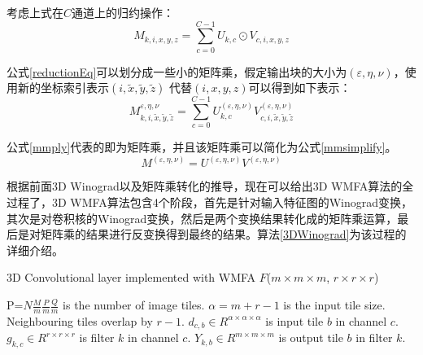 考虑上式在$C$通道上的归约操作：
\begin{equation}
\label{reductionEq}
M_{k,i,x,y,z} = \sum_{c=0}^{C-1}U_{k,c}\odot V_{c,i,x,y,z}
\end{equation} 

公式\ref{reductionEq}可以划分成一些小的矩阵乘，假定输出块的大小为$(\varepsilon,\eta,\nu)$，使用新的坐标索引表示$(i,\tilde{x},\tilde{y},\tilde{z})$ 代替$(i,x,y,z)$可以得到如下表示：
\begin{equation}
\label{mmply}
M_{k,i,\tilde{x},\tilde{y},\tilde{z}}^{\varepsilon,\eta,\nu} = \sum_{c=0}^{C-1}U_{k,c}^{(\varepsilon,\eta,\nu)}V_{c,i,\tilde{x},\tilde{y},\tilde{z}}^{(\varepsilon,\eta,\nu)}
\end{equation} 

公式\ref{mmply}代表的即为矩阵乘，并且该矩阵乘可以简化为公式\ref{mmsimplify}。
\begin{equation}
\label{mmsimplify}
M^{(\varepsilon,\eta,\nu)} = U^{(\varepsilon,\eta,\nu)}V^{(\varepsilon,\eta,\nu)}
\end{equation}

根据前面3D Winograd以及矩阵乘转化的推导，现在可以给出3D WMFA算法的全过程了，3D WMFA算法包含4个阶段，首先是针对输入特征图的Winograd变换，其次是对卷积核的Winograd变换，然后是两个变换结果转化成的矩阵乘运算，最后是对矩阵乘的结果进行反变换得到最终的结果。算法\ref{3DWinograd}为该过程的详细介绍。
\begin{algorithm}
\caption{3D Convolutional layer implemented with WMFA $F$($m \times m \times m$, $r \times r \times r$)}
 \label{3DWinograd}
\begin{algorithmic} 
\STATE P=$N{\frac{M}{m}}{\frac{P}{m}}{\frac{Q}{m}}$ is the number of image tiles.
\STATE $\alpha = m+r-1$ is the input tile size.
\STATE Neighbouring tiles overlap by $r-1$.
\STATE $d_{c,b}\in \!R^{\alpha\times\alpha\times\alpha}$ is input tile $b$ in channel $c$.
\STATE $g_{k,c}\in \!R^{r\times r \times r}$ is filter $k$ in channel $c$.
\STATE $Y_{k,b}\in \!R^{m\times m \times m}$ is output tile $b$ in filter $k$.
  \ENDFOR
\ENDFOR

  \ENDFOR
\ENDFOR

    \ENDFOR 
  \ENDFOR
\ENDFOR

  \ENDFOR
\ENDFOR
\end{algorithmic}
\end{algorithm}


